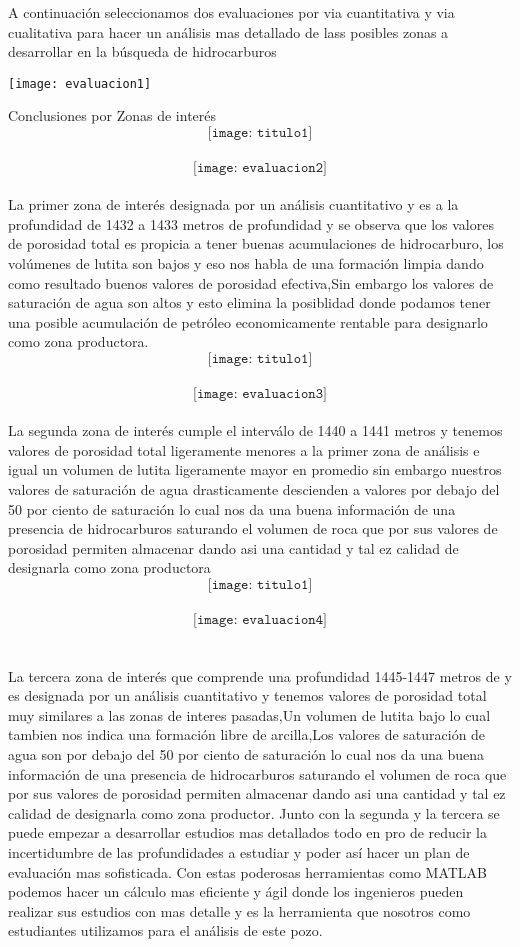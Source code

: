 \documentclass[10pt,a4paper]{report}
\begin{document}
\newpage
A continuación seleccionamos dos evaluaciones por via cuantitativa y via cualitativa para hacer un análisis mas detallado de lass posibles zonas a desarrollar en la búsqueda de hidrocarburos
\begin{center}
\texttt{[image: evaluacion1]}
\end{center}
Conclusiones por Zonas de interés
\\ $$\texttt{[image: titulo1]}$$
\\ $$\texttt{[image: evaluacion2]}$$
\\ La primer zona de interés designada por un análisis cuantitativo y es a la profundidad de 1432 a 1433 metros de profundidad y se observa que los  valores de porosidad total es propicia a tener buenas acumulaciones de hidrocarburo, los volúmenes de lutita son bajos y eso nos habla de una formación limpia dando como resultado buenos valores de porosidad efectiva,Sin embargo los valores de saturación de agua son altos y esto elimina la posiblidad donde podamos tener una posible acumulación de petróleo economicamente rentable para designarlo como zona productora.
\newpage
$$\texttt{[image: titulo1]}$$
\\ $$\texttt{[image: evaluacion3]}$$
\\ La segunda zona de interés cumple el interválo de 1440 a 1441 metros y tenemos valores de porosidad total ligeramente menores a la primer zona de análisis e igual un volumen de lutita ligeramente mayor en promedio sin embargo nuestros valores de saturación de agua drasticamente descienden a valores por debajo del 50 por ciento de saturación lo cual nos da una buena información de una presencia de hidrocarburos saturando el volumen de roca que por sus valores de porosidad permiten almacenar dando asi una cantidad y tal ez calidad de designarla como zona productora
\\ $$\texttt{[image: titulo1]}$$
\\ $$\texttt{[image: evaluacion4]}$$
\\ \\ La tercera zona de interés que comprende una profundidad 1445-1447 metros de  y es designada por un análisis cuantitativo y tenemos valores de porosidad total muy similares a las zonas de interes pasadas,Un volumen de lutita bajo lo cual tambien nos indica una formación libre de arcilla,Los valores de saturación de agua son por debajo del 50 por ciento de saturación lo cual nos da una buena información de una presencia de hidrocarburos saturando el volumen de roca que por sus valores de porosidad permiten almacenar dando asi una cantidad y tal ez calidad de designarla como zona productor. Junto con la segunda y la tercera se puede empezar a desarrollar estudios mas detallados todo en pro de reducir la incertidumbre de las profundidades a estudiar y poder así hacer un plan de evaluación mas sofisticada. Con estas poderosas herramientas como MATLAB podemos hacer un cálculo mas eficiente y ágil donde los ingenieros pueden realizar sus estudios con mas detalle y es la herramienta que nosotros como estudiantes utilizamos para el análisis de este pozo.
\end{document}
